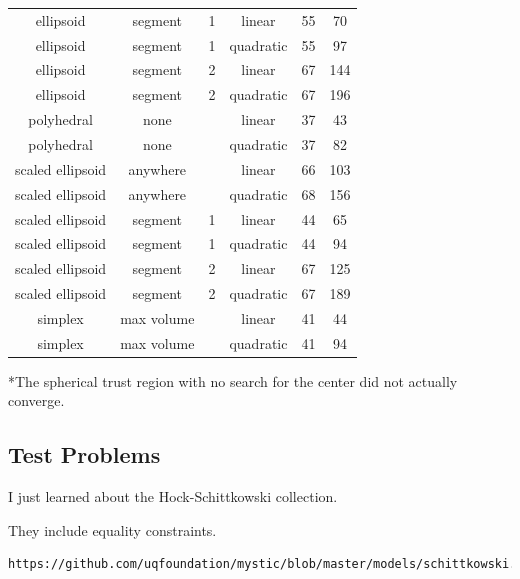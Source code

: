 \documentclass{article}
\theoremstyle{case}
\begin{document}
\begin{center}
\begin{tabular}{ c c c c c c }
                ellipsoid &    segment &     1 &     linear &    55 &    70 \\
                ellipsoid &    segment &     1 &  quadratic &    55 &    97 \\
                ellipsoid &    segment &     2 &     linear &    67 &   144 \\
                ellipsoid &    segment &     2 &  quadratic &    67 &   196 \\
               polyhedral &       none &       &     linear &    37 &    43 \\
               polyhedral &       none &       &  quadratic &    37 &    82 \\
         scaled ellipsoid &   anywhere &       &     linear &    66 &   103 \\
         scaled ellipsoid &   anywhere &       &  quadratic &    68 &   156 \\
         scaled ellipsoid &    segment &     1 &     linear &    44 &    65 \\
         scaled ellipsoid &    segment &     1 &  quadratic &    44 &    94 \\
         scaled ellipsoid &    segment &     2 &     linear &    67 &   125 \\
         scaled ellipsoid &    segment &     2 &  quadratic &    67 &   189 \\
                  simplex & max volume &       &     linear &    41 &    44 \\
                  simplex & max volume &       &  quadratic &    41 &    94 \\
\end{tabular}
\end{center}

*The spherical trust region with no search for the center did not actually converge.


\color{red}
\subsection{Test Problems}

I just learned about the Hock-Schittkowski collection.

They include equality constraints.

\begin{verbatim}
https://github.com/uqfoundation/mystic/blob/master/models/schittkowski.py
\end{verbatim}
\end{document}
